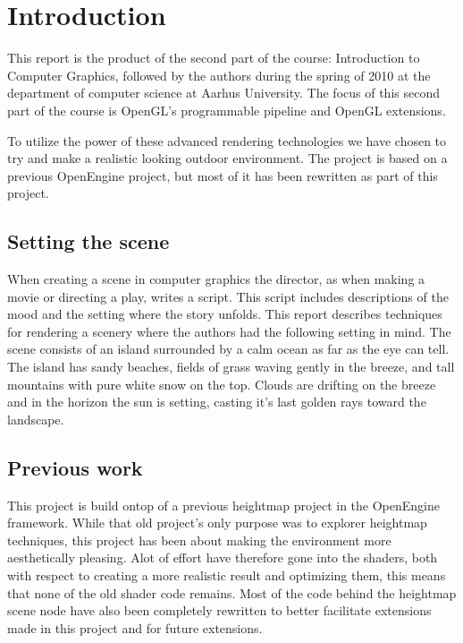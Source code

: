 
\chapter{Introduction}
This report is the product of the second part of the course:
Introduction to Computer Graphics, followed by the authors during the
spring of 2010 at the department of computer science at Aarhus
University. The focus of this second part of the course is OpenGL's
programmable pipeline and OpenGL extensions.

To utilize the power of these advanced rendering technologies we have
chosen to try and make a realistic looking outdoor environment. The
project is based on a previous OpenEngine project, but most of it has
been rewritten as part of this project.

\section{Setting the scene}
When creating a scene in computer graphics the director, as when
making a movie or directing a play, writes a script. This script
includes descriptions of the mood and the setting where the story
unfolds.
%
This report describes techniques for rendering a scenery 
where the authors had the following setting in mind.
%
The scene consists of an island surrounded by a calm ocean as far
as the eye can tell. The island has sandy beaches, fields of grass
waving gently in the breeze, and tall mountains with pure white snow
on the top. Clouds are drifting on the breeze and in the horizon
the sun is setting, casting it's last golden rays toward the
landscape.

\section{Previous work}
This project is build ontop of a previous heightmap project in the
OpenEngine framework. While that old project's only purpose was to
explorer heightmap techniques, this project has been about making the
environment more aesthetically pleasing. Alot of effort have therefore
gone into the shaders, both with respect to creating a more realistic
result and optimizing them, this means that none of the old shader code
remains. Most of the code behind the heightmap scene node have also
been completely rewritten to better facilitate extensions made in this
project and for future extensions.

